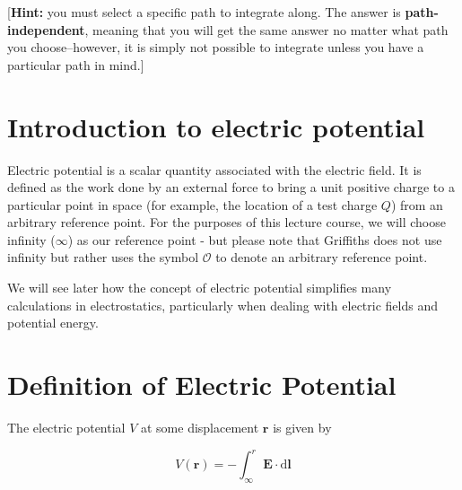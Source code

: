 \documentclass[
  letterpaper,
  DIV=11,
  numbers=noendperiod]{scrreprt}
\begin{document}
{[}\textbf{Hint:} you must select a specific path to integrate along.
The answer is \textbf{path-independent}, meaning that you will get the
same answer no matter what path you choose--however, it is simply not
possible to integrate unless you have a particular path in mind.{]}

\section{Introduction to electric
potential}\label{introduction-to-electric-potential}

Electric potential is a scalar quantity associated with the electric
field. It is defined as the work done by an external force to bring a
unit positive charge to a particular point in space (for example, the
location of a test charge \(Q\)) from an arbitrary reference point. For
the purposes of this lecture course, we will choose infinity
(\(\infty\)) as our reference point - but please note that Griffiths
does not use infinity but rather uses the symbol \(\mathcal{O}\) to
denote an arbitrary reference point.

We will see later how the concept of electric potential simplifies many
calculations in electrostatics, particularly when dealing with electric
fields and potential energy.

\section{Definition of Electric
Potential}\label{definition-of-electric-potential}

The electric potential \(V\) at some displacement
\(\mathrm{\mathbf{r}}\) is given by

\[ V(\mathrm{\mathbf{r}}) = −\int_{\infty}^r \mathrm{\mathbf{E}}\cdot \mathrm{d}\mathrm{\mathbf{l}}\]
\end{document}
